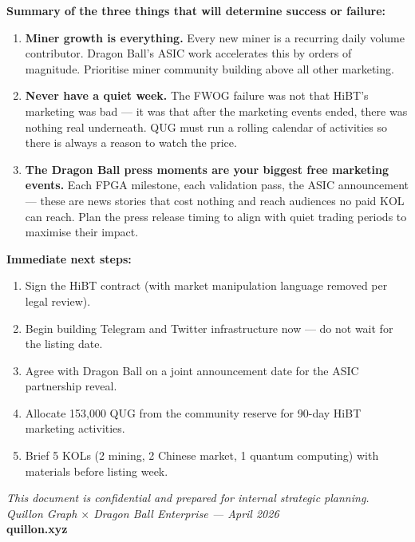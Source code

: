 \documentclass[11pt,a4paper]{article}
\begin{document}
\begin{greenbox}
\textbf{Summary of the three things that will determine success or failure:}

\begin{enumerate}[leftmargin=1em, itemsep=3pt]
  \item \textbf{Miner growth is everything.} Every new miner is a recurring daily volume contributor. Dragon Ball's ASIC work accelerates this by orders of magnitude. Prioritise miner community building above all other marketing.

  \item \textbf{Never have a quiet week.} The FWOG failure was not that HiBT's marketing was bad — it was that after the marketing events ended, there was nothing real underneath. QUG must run a rolling calendar of activities so there is always a reason to watch the price.

  \item \textbf{The Dragon Ball press moments are your biggest free marketing events.} Each FPGA milestone, each validation pass, the ASIC announcement — these are news stories that cost nothing and reach audiences no paid KOL can reach. Plan the press release timing to align with quiet trading periods to maximise their impact.
\end{enumerate}
\end{greenbox}

\medskip

\textbf{Immediate next steps:}

\begin{enumerate}[leftmargin=1.5em]
  \item Sign the HiBT contract (with market manipulation language removed per legal review).
  \item Begin building Telegram and Twitter infrastructure now — do not wait for the listing date.
  \item Agree with Dragon Ball on a joint announcement date for the ASIC partnership reveal.
  \item Allocate 153,000 QUG from the community reserve for 90-day HiBT marketing activities.
  \item Brief 5 KOLs (2 mining, 2 Chinese market, 1 quantum computing) with materials before listing week.
\end{enumerate}

\vfill
\begin{center}
\small\color{midgray}
\textit{This document is confidential and prepared for internal strategic planning.\\
Quillon Graph $\times$ Dragon Ball Enterprise — April 2026}\\[4pt]
\textbf{quillon.xyz}
\end{center}
\end{document}
